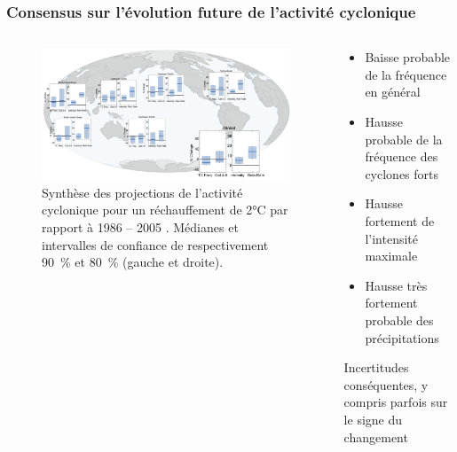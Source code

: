 \documentclass[aspectratio=169, usepdftitle=false, xcolor={dvipsnames}, 9pt]{beamer}
\begin{document}
\begin{frame}[c]
    \frametitle{Consensus sur l'évolution future de l'activité cyclonique}
    \begin{columns}
        \begin{column}{0.75\textwidth}
            \begin{figure}[h]
                \centering
                \includegraphics[width=\textwidth]{Figures/Fig_5_Knutson_BAMS_revised_3_9_20-scaled_cropped.png}
                \caption{Synthèse des projections de l'activité cyclonique pour un réchauffement de 2°C par rapport à 1986 -- 2005
                \parencite{knutson_tropical_2020}. Médianes et intervalles de confiance de respectivement 90~\% et 80~\% (gauche et droite).}
            \end{figure}
        \end{column}
        \begin{column}{0.25\textwidth}
           \footnotesize
           \setlength{\leftmargini}{2.5ex}
           \begin{block}[Résumé]
               \scriptsize
               \begin{itemize}
                    \item Baisse probable de la fréquence en général 
                    \item Hausse probable de la fréquence des cyclones forts
                    \item Hausse fortement de l'intensité maximale
                    \item Hausse très fortement probable des précipitations
               \end{itemize}
           \end{block}
           \pause
           \begin{alertblock}
                \scriptsize
                Incertitudes conséquentes, y compris parfois sur le signe du changement
           \end{alertblock}
        \end{column}
    \end{columns}
\end{frame}
\end{document}
